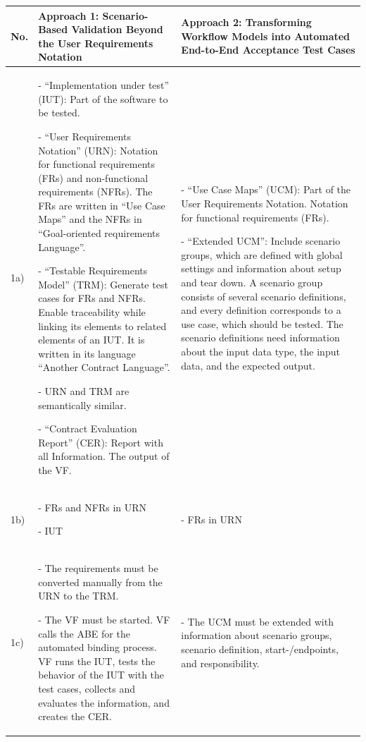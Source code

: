 \newpage
{}
\begin{landscape}
	\begin{small}
	\begin{table}
		\caption{Synthesis Matrix part 1/2.}
		\begin{longtable}[h]{>{\raggedright}p{0.5cm}|>{}p{11cm}|>{}p{11cm}}
			\hline
			\textbf{No.} 
			& \textbf{Approach 1: Scenario-Based Validation Beyond the User Requirements Notation} 
			& \textbf{Approach 2: Transforming Workflow Models into Automated End-to-End Acceptance Test Cases}\\ \hline
			1a)
			&- \enquote{Implementation under test} (IUT): Part of the software to be tested. 
			
			- \enquote{User Requirements Notation} (URN): Notation for functional requirements (FRs) and non-functional requirements (NFRs). The FRs are written in \enquote{Use Case Maps} and the NFRs in \enquote{Goal-oriented requirements Language}.
			
			- \enquote{Testable Requirements Model} (TRM): Generate test cases for FRs and NFRs. Enable traceability while linking its elements to related elements of an IUT. It is written in its language \enquote{Another Contract Language}. 
			
			- URN and TRM are semantically similar.
			
			- \enquote{Contract Evaluation Report} (CER): Report with all Information. The output of the VF.
			&- \enquote{Use Case Maps} (UCM): Part of the User Requirements Notation. Notation for functional requirements (FRs).
			
			- \enquote{Extended UCM}: Include scenario groups, which are defined with global settings and information about setup and tear down. A scenario group consists of several scenario definitions, and every definition corresponds to a use case, which should be tested. The scenario definitions need information about the input data type, the input data, and the expected output.
			\\ \hline
			1b)
			&  - FRs and NFRs in URN
			
			- IUT
			& 
			- FRs in URN \\ \hline
			1c)
			& - The requirements must be converted manually from the URN to the TRM.
			
			- The VF must be started. VF calls the ABE for the automated binding process. VF runs the IUT, tests the behavior of the IUT with the test cases, collects and evaluates the information, and creates the CER.
			&
			- The UCM must be extended with information about scenario groups, scenario definition, start-/endpoints, and responsibility.
			

\end{longtable}
\end{table}
\end{small}
\end{landscape}
